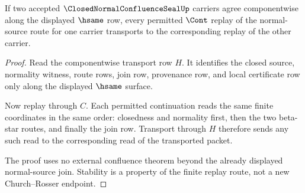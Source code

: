 \begin{theorem}
\label{thm:closed-normal-confluence-seal-route-stability}
If two accepted $\ClosedNormalConfluenceSealUp$ carriers agree componentwise
along the displayed $\hsame$ row, every permitted $\Cont$ replay of the
normal-source route for one carrier transports to the corresponding replay of
the other carrier.
\end{theorem}
\begin{proof}
Read the componentwise transport row $H$. It identifies the closed source,
normality witness, route rows, join row, provenance row, and local certificate
row only along the displayed $\hsame$ surface.

Now replay through $C$. Each permitted continuation reads the same finite
coordinates in the same order: closedness and normality first, then the two
beta-star routes, and finally the join row. Transport through $H$ therefore
sends any such read to the corresponding read of the transported packet.

The proof uses no external confluence theorem beyond the already displayed
normal-source join. Stability is a property of the finite replay route, not a
new Church--Rosser endpoint.
\end{proof}

